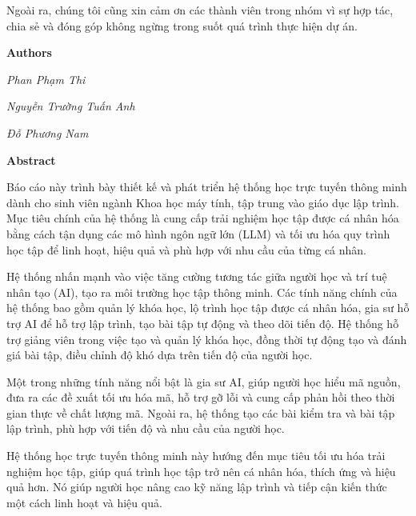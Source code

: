 \documentclass[12pt,a4paper]{report}
\theoremstyle{definition}
\begin{document}
Ngoài ra, chúng tôi cũng xin cảm ơn các thành viên trong nhóm vì sự hợp tác, chia sẻ và đóng góp không ngừng trong suốt quá trình thực hiện dự án.
\par\hfill\textbf{Authors}\hspace{1cm}

\par\hfill\textit{Phan Phạm Thi}\hspace{0.3cm}
\par\hfill\textit{Nguyễn Trường Tuấn Anh}\hspace{0.2cm}\par\hfill\textit{Đỗ Phương Nam}
\newpage

\begin{center}
	\textbf{\Large Abstract} \par
\end{center}
Báo cáo này trình bày thiết kế và phát triển hệ thống học trực tuyến thông minh dành cho sinh viên ngành Khoa học máy tính, tập trung vào giáo dục lập trình. Mục tiêu chính của hệ thống là cung cấp trải nghiệm học tập được cá nhân hóa bằng cách tận dụng các mô hình ngôn ngữ lớn (LLM) và tối ưu hóa quy trình học tập để linh hoạt, hiệu quả và phù hợp với nhu cầu của từng cá nhân.

Hệ thống nhấn mạnh vào việc tăng cường tương tác giữa người học và trí tuệ nhân tạo (AI), tạo ra môi trường học tập thông minh. Các tính năng chính của hệ thống bao gồm quản lý khóa học, lộ trình học tập được cá nhân hóa, gia sư hỗ trợ AI để hỗ trợ lập trình, tạo bài tập tự động và theo dõi tiến độ. Hệ thống hỗ trợ giảng viên trong việc tạo và quản lý khóa học, đồng thời tự động tạo và đánh giá bài tập, điều chỉnh độ khó dựa trên tiến độ của người học.

Một trong những tính năng nổi bật là gia sư AI, giúp người học hiểu mã nguồn, đưa ra các đề xuất tối ưu hóa mã, hỗ trợ gỡ lỗi và cung cấp phản hồi theo thời gian thực về chất lượng mã. Ngoài ra, hệ thống tạo các bài kiểm tra và bài tập lập trình, phù hợp với tiến độ và nhu cầu của người học.

Hệ thống học trực tuyến thông minh này hướng đến mục tiêu tối ưu hóa trải nghiệm học tập, giúp quá trình học tập trở nên cá nhân hóa, thích ứng và hiệu quả hơn. Nó giúp người học nâng cao kỹ năng lập trình và tiếp cận kiến thức một cách linh hoạt và hiệu quả.
\newpage

\begin{singlespace}
	\tableofcontents
\end{singlespace}
\newpage
\end{document}
